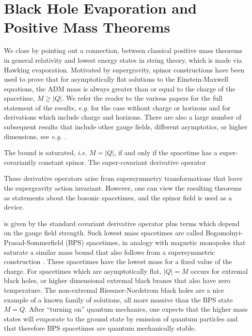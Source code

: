 \documentclass[12pt]{article}
\begin{document}
\section{Black Hole Evaporation and Positive Mass Theorems}
\label{s7}

We close  by pointing out a connection, between classical
positive mass theorems in general relativity and lowest energy states
in string theory, which is made via Hawking evaporation.
Motivated by supergravity, spinor constructions have been used to prove that for
asymptotically flat solutions to the Einstein-Maxwell equations, the ADM
mass is
always greater than or
equal to the charge of the spacetime, $M\ge |Q|$. We refer the reader to
the various papers for the full statement of the results, {\it e.g.}
\cite{witten,nester} for the case without charge or horizons and
\cite{gibhull,ghhp}  for
derivations which include charge and horizons. There are also a large number of subsequent
results that include other gauge fields, different asymptotics, or higher
dimensions, see {\it
e.g.} \cite{sorkin,gktt}.

The bound is saturated, {\it i.e.}  $M=|Q|$, if and only if the spacetime
has a super-covariantly constant spinor. The super-covariant derivative
operator\begin{footnote}{These
derivative operators arise
from supersymmetry transformations that leave the supergravity action
invariant. However, one can view the
resulting theorems as statements about the bosonic spacetimes, and the
spinor field is used as a device.}
\end{footnote}
is given by the standard covariant derivative operator plus terms which
depend on the gauge field strength. Such lowest mass spacetimes are called
Bogomolnyi-Prasad-Sommerfield
(BPS) spacetimes, in analogy with magnetic monopoles that saturate a
similar mass bound \cite{bogo,prasad}
that also follows from a supersymmetric construction \cite{wo}.
These spacetimes have the lowest mass for a fixed value of the charge.
For spacetimes which are asymptotically flat, $|Q|=M$ occurs for extremal
black holes,
or higher dimensional extremal black branes that also have zero temperature.
The non-extremal Riessner-Nordstrom black holes are a nice example of a
known family
of solutions, all more massive than the BPS state $M=Q$.
After ``turning on'' quantum mechanics, one expects that
the higher mass states will evaporate to the ground state by emission
of quantum particles and that therefore BPS spacetimes are quantum
mechanically stable.
\end{document}
